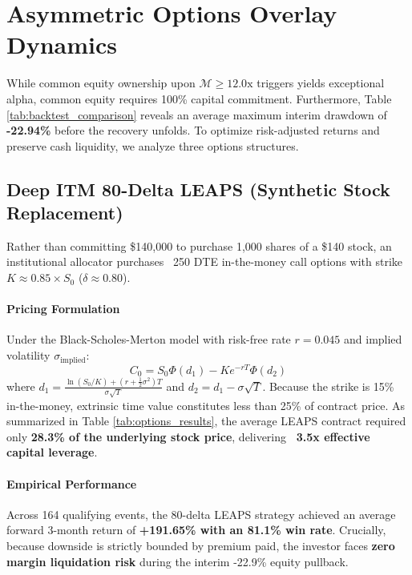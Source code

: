 \documentclass[11pt]{article}
\begin{document}
\section{Asymmetric Options Overlay Dynamics}

While common equity ownership upon $\mathcal{M} \ge 12.0\text{x}$ triggers yields exceptional alpha, common equity requires 100\% capital commitment. Furthermore, Table \ref{tab:backtest_comparison} reveals an average maximum interim drawdown of \textbf{-22.94\%} before the recovery unfolds. To optimize risk-adjusted returns and preserve cash liquidity, we analyze three options structures.

\subsection{Deep ITM 80-Delta LEAPS (Synthetic Stock Replacement)}

Rather than committing \$140,000 to purchase 1,000 shares of a \$140 stock, an institutional allocator purchases ~250 DTE in-the-money call options with strike $K \approx 0.85 \times S_0$ ($\delta \approx 0.80$).

\paragraph{Pricing Formulation}
Under the Black-Scholes-Merton model with risk-free rate $r=0.045$ and implied volatility $\sigma_{\text{implied}}$:
\begin{equation}
    C_0 = S_0 \Phi(d_1) - K e^{-r T} \Phi(d_2)
\end{equation}
where $d_1 = \frac{\ln(S_0/K) + (r + \frac{1}{2}\sigma^2)T}{\sigma\sqrt{T}}$ and $d_2 = d_1 - \sigma\sqrt{T}$. Because the strike is 15\% in-the-money, extrinsic time value constitutes less than 25\% of contract price. As summarized in Table \ref{tab:options_results}, the average LEAPS contract required only \textbf{28.3\% of the underlying stock price}, delivering \textbf{~3.5x effective capital leverage}.

\paragraph{Empirical Performance}
Across 164 qualifying events, the 80-delta LEAPS strategy achieved an average forward 3-month return of \textbf{+191.65\% with an 81.1\% win rate}. Crucially, because downside is strictly bounded by premium paid, the investor faces \textbf{zero margin liquidation risk} during the interim -22.9\% equity pullback.
\end{document}
